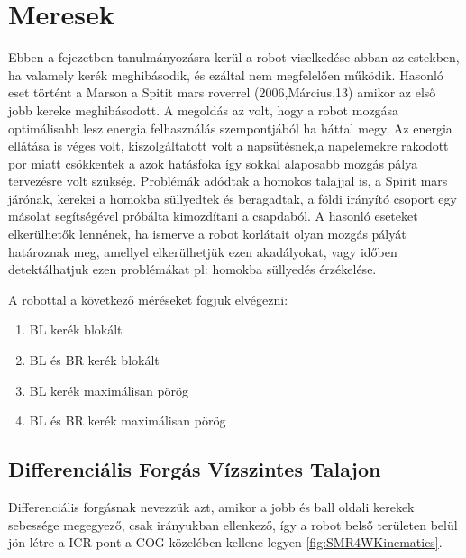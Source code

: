 \section{Meresek}
Ebben a fejezetben tanulmányozásra kerül a robot viselkedése abban az estekben, ha valamely kerék meghibásodik, és ezáltal nem megfelelően működik.
Hasonló eset történt a Marson a Spitit mars roverrel (2006,Március,13) \cite{SpititWheel1} amikor az első jobb kereke meghibásodott. A megoldás az volt, hogy a robot mozgása optimálisabb lesz energia felhasználás szempontjából ha háttal megy. Az energia ellátása is véges volt, kiszolgáltatott volt a napsütésnek,a napelemekre rakodott por miatt csökkentek a azok hatásfoka így sokkal alaposabb mozgás pálya tervezésre volt szükség.
Problémák adódtak a homokos talajjal is, a Spirit mars járónak, kerekei a homokba süllyedtek és beragadtak, a földi irányító csoport egy másolat segítségével próbálta kimozdítani a csapdaból.
A hasonló eseteket elkerülhetők lennének, ha ismerve a robot korlátait olyan mozgás pályát határoznak meg, amellyel elkerülhetjük ezen akadályokat, vagy időben detektálhatjuk ezen problémákat pl: homokba süllyedés érzékelése.


A robottal a következő méréseket fogjuk elvégezni:
\begin{enumerate}[label=(\alph*)]
\item BL kerék blokált
\item BL és BR kerék blokált
\item BL kerék maximálisan pörög
\item BL és BR kerék maximálisan pörög
\end{enumerate}


\subsection{Differenciális Forgás Vízszintes Talajon}

Differenciális forgásnak nevezzük azt, amikor a jobb és ball oldali kerekek sebessége megegyező, csak irányukban ellenkező, így a robot belső területen belül jön létre a ICR pont a COG közelében kellene legyen \ref{fig:SMR4WKinematics}. 














